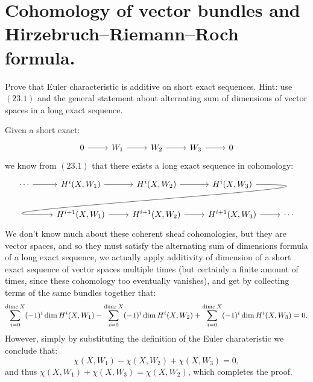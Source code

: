 \documentclass[11pt, a4paper]{article}
\begin{document}
\newpage

\section{Cohomology of vector bundles and Hirzebruch--Riemann--Roch formula.}

\begin{exercise}
  Prove that Euler characteristic is additive on short exact sequences.
  Hint: use $(23.1)$ and the general statement about alternating sum of
  dimensions of vector spaces in a long exact sequence.
\end{exercise}
\begin{solution}
  Given a short exact:
  \[\begin{tikzcd}
    0 & {W_1} & {W_2} & {W_3} & 0
    \arrow[from=1-1, to=1-2]
    \arrow[from=1-2, to=1-3]
    \arrow[from=1-3, to=1-4]
    \arrow[from=1-4, to=1-5]
  \end{tikzcd}\]
  we know from $(23.1)$ that there exists a long exact sequence in
  cohomology:
  \[
    \begin{tikzcd}
      \cdots \ar[r] & H^i(X,W_1) \ar[r] & H^i(X,W_2) \ar[r] & H^i(X,W_3)
        \ar[out=0, in=180, looseness=2, overlay, lld] \\
      & H^{i+1}(X,W_1) \ar[r] & H^{i+1}(X,W_2) \ar[r] & H^{i+1}(X,W_3) \ar [r] & \cdots
    \end{tikzcd}
  \]
  We don't know much about these coherent sheaf cohomologies,
  but they are vector spaces, and so they must satisfy the alternating
  sum of dimensions formula of a long exact sequence,
  we actually apply additivity of dimension of a short exact sequence of vector
  spaces multiple times (but certainly a finite amount of times, since
  these cohomology too eventually vanishes), and get by collecting
  terms of the same bundles together that:
  \[
    \sum_{i=0}^{\dim_{\mathbb{C}} X} (-1)^i \dim H^i(X,W_1) -
    \sum_{i=0}^{\dim_{\mathbb{C}} X} (-1)^i \dim H^i(X,W_2) +
    \sum_{i=0}^{\dim_{\mathbb{C}} X} (-1)^i \dim H^i(X,W_3) = 0.
  \]
  However, simply by substituting the definition of the Euler charateristic we
  conclude that:
  \[
    \chi(X,W_1) - \chi(X,W_2) + \chi(X,W_3) = 0,
  \]
  and thus $\chi(X,W_1) + \chi(X,W_3) = \chi(X,W_2)$,
  which completes the proof.
\end{solution}
\end{document}
